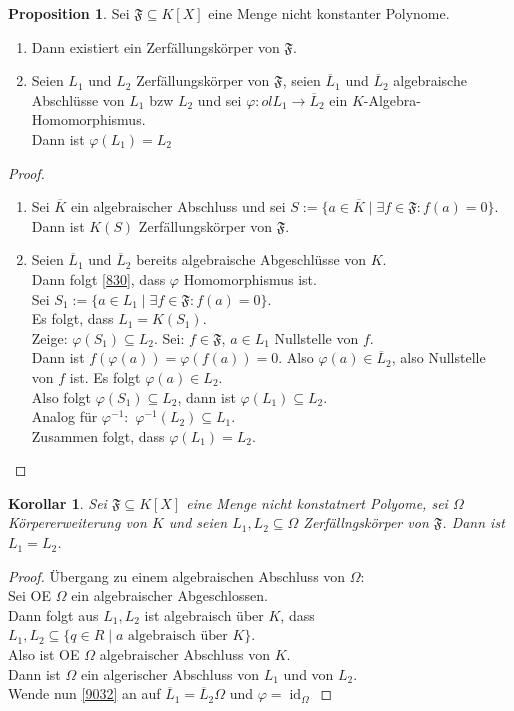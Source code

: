 \documentclass[10pt,a4paper]{article}
\newcommand{\ol}[1]{\overline{#1}}
\newcommand{\id}{\operatorname{id}}
\newcounter{thm}[section]
\theoremstyle{definition}
\newtheorem{prop}[thm]{Proposition}
\theoremstyle{plain}
\newtheorem{kor}[thm]{Korollar}
\theoremstyle{remark}
\begin{document}
\begin{prop}
	Sei $\mathfrak F\subseteq K[X]$ eine Menge nicht konstanter Polynome.
	\begin{enumerate}
		\item Dann existiert ein Zerfällungskörper von $\mathfrak F$.
		\item Seien $L_1$ und $L_2$ Zerfällungskörper von $\mathfrak F$, seien $\ol L_1$ und $\ol L_2$ algebraische Abschlüsse von $L_1$ bzw $L_2$ und sei $\varphi:ol L_1\rightarrow \ol L_2$ ein $K$-Algebra-Homomorphismus.\\
		Dann ist $\varphi(L_1)=L_2$
	\end{enumerate}
\end{prop}
\begin{proof}
	\begin{enumerate}
		\item Sei $\ol K$ ein algebraischer Abschluss und sei $S:=\{a\in \ol K\mid \exists f\in \mathfrak F:f(a)=0\}$.\\
		Dann ist $K(S)$ Zerfällungskörper von $\mathfrak F$.
		\item Seien $\ol L_1$ und $\ol L_2$ bereits algebraische Abgeschlüsse von $K$.\\
		Dann folgt \ref{830}, dass $\varphi$ Homomorphismus ist.\\
		Sei $S_1:=\{a\in L_1\mid\exists f\in\mathfrak F: f(a)=0 \}$.\\
		Es folgt, dass $L_1=K(S_1)$.\\
		Zeige: $\varphi(S_1)\subseteq L_2$. Sei: $f\in\mathfrak F$, $a\in L_1$ Nullstelle von $f$.\\
		Dann ist $f(\varphi(a))=\varphi(f(a))=0$. Also $\varphi(a)\in\ol L_2$, also Nullstelle von $f$ ist. Es folgt $\varphi(a)\in L_2$.\\
		Also folgt $\varphi(S_1)\subseteq L_2$, dann ist $\varphi(L_1)\subseteq L_2$.\\
		Analog für $\varphi^{-1}:$ $\varphi^{-1}(L_2)\subseteq L_1$.\\
		Zusammen folgt, dass $\varphi(L_1)=L_2$.
	\end{enumerate}
\end{proof}

\begin{kor}
	Sei $\mathfrak F\subseteq K[X]$ eine Menge nicht konstatnert Polyome, sei $\Omega$ Körpererweiterung von $K$ und seien $L_1,L_2\subseteq\Omega$ Zerfällngskörper von $\mathfrak F$. Dann ist $L_1=L_2$.
\end{kor}
\begin{proof}
	Übergang zu einem algebraischen Abschluss  von $\Omega$:\\
	Sei OE $\Omega$ ein algebraischer Abgeschlossen.\\
	Dann folgt aus $L_1,L_2$ ist algebraisch über $K$, dass $L_1,L_2\subseteq \{q\in R\mid \text{$a$ algebraisch über $K$}\}$.\\
	Also ist OE $\Omega$ algebraischer Abschluss von $K$.\\
	Dann ist $\Omega$ ein algerischer Abschluss von $L_1$ und von $L_2$.\\
	Wende nun \ref{9032} an auf $\ol L_1=\ol L_2\Omega$ und $\varphi=\id_{\Omega}$
\end{proof}
\end{document}
